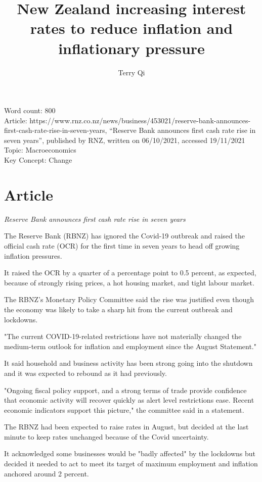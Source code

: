 \documentclass[a4paper,12pt]{article}
\title{New Zealand increasing interest rates to reduce inflation and inflationary pressure}
\author{Terry Qi}
\begin{document}
\maketitle

Word count: 800\\
Article: https://www.rnz.co.nz/news/business/453021/reserve-bank-announces-first-cash-rate-rise-in-seven-years, ``Reserve Bank announces first cash rate rise in seven years'', published by RNZ, written on 06/10/2021, accessed 19/11/2021\\
Topic: Macroeconomics\\
Key Concept: Change

\newpage

\section*{Article}

\textit{Reserve Bank announces first cash rate rise in seven years}

The Reserve Bank (RBNZ) has ignored the Covid-19 outbreak and raised the official cash rate (OCR) for the first time in seven years to head off growing inflation pressures.

It raised the OCR by a quarter of a percentage point to 0.5 percent, as expected, because of strongly rising prices, a hot housing market, and tight labour market.

The RBNZ's Monetary Policy Committee said the rise was justified even though the economy was likely to take a sharp hit from the current outbreak and lockdowns.

"The current COVID-19-related restrictions have not materially changed the medium-term outlook for inflation and employment since the August Statement."

It said household and business activity has been strong going into the shutdown and it was expected to rebound as it had previously.

"Ongoing fiscal policy support, and a strong terms of trade provide confidence that economic activity will recover quickly as alert level restrictions ease. Recent economic indicators support this picture," the committee said in a statement.

The RBNZ had been expected to raise rates in August, but decided at the last minute to keep rates unchanged because of the Covid uncertainty.

It acknowledged some businesses would be "badly affected" by the lockdowns but decided it needed to act to meet its target of maximum employment and inflation anchored around 2 percent.
\end{document}
